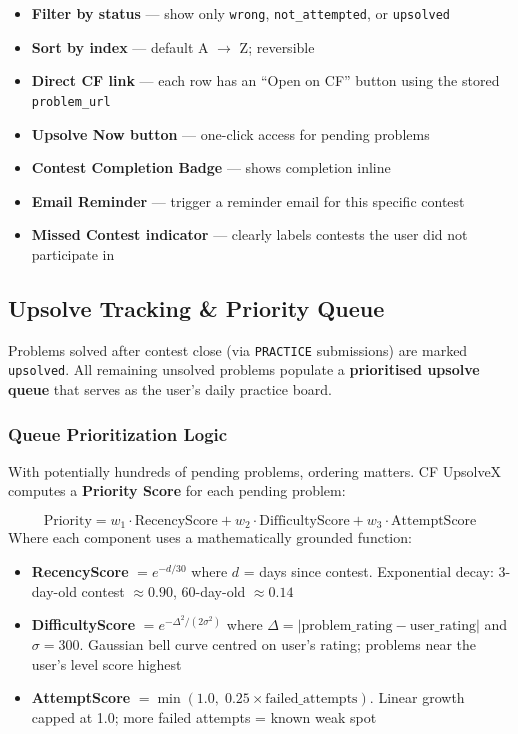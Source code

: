 \documentclass[11pt, a4paper]{article}
\begin{document}
\begin{itemize}
  \item \textbf{Filter by status} --- show only \texttt{wrong}, \texttt{not\_attempted},
        or \texttt{upsolved}
  \item \textbf{Sort by index} --- default A $\to$ Z; reversible
  \item \textbf{Direct CF link} --- each row has an ``Open on CF'' button using the
        stored \texttt{problem\_url}
  \item \textbf{Upsolve Now button} --- one-click access for pending problems
  \item \textbf{Contest Completion Badge} --- shows completion inline
  \item \textbf{Email Reminder} --- trigger a reminder email for this specific contest
  \item \textbf{Missed Contest indicator} --- clearly labels contests the user did not participate in
\end{itemize}

\subsection{Upsolve Tracking \& Priority Queue}

Problems solved after contest close (via \texttt{PRACTICE} submissions) are
marked \texttt{upsolved}. All remaining unsolved problems populate a
\textbf{prioritised upsolve queue} that serves as the user's daily practice board.

\subsubsection{Queue Prioritization Logic}

With potentially hundreds of pending problems, ordering matters.
CF UpsolveX computes a \textbf{Priority Score} for each pending problem:

\begin{infobox}
\[
  \text{Priority} = w_1 \cdot \text{RecencyScore} + w_2 \cdot \text{DifficultyScore} + w_3 \cdot \text{AttemptScore}
\]
Where each component uses a mathematically grounded function:
\begin{itemize}
  \item \textbf{RecencyScore} $= e^{-d/30}$ where $d$ = days since contest.
        Exponential decay: 3-day-old contest $\approx 0.90$, 60-day-old $\approx 0.14$
  \item \textbf{DifficultyScore} $= e^{-\Delta^2 / (2\sigma^2)}$ where
        $\Delta = |\text{problem\_rating} - \text{user\_rating}|$ and $\sigma = 300$.
        Gaussian bell curve centred on user's rating; problems near the user's
        level score highest
  \item \textbf{AttemptScore} $= \min(1.0,\; 0.25 \times \text{failed\_attempts})$.
        Linear growth capped at 1.0; more failed attempts = known weak spot
\end{itemize}
\end{infobox}
\end{document}
